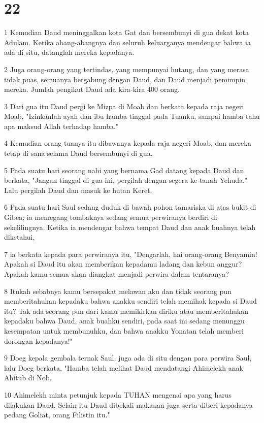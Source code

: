 \chapter{22}

\par 1 Kemudian Daud meninggalkan kota Gat dan bersembunyi di gua dekat kota Adulam. Ketika abang-abangnya dan seluruh keluarganya mendengar bahwa ia ada di situ, datanglah mereka kepadanya.
\par 2 Juga orang-orang yang tertindas, yang mempunyai hutang, dan yang merasa tidak puas, semuanya bergabung dengan Daud, dan Daud menjadi pemimpin mereka. Jumlah pengikut Daud ada kira-kira 400 orang.
\par 3 Dari gua itu Daud pergi ke Mizpa di Moab dan berkata kepada raja negeri Moab, "Izinkanlah ayah dan ibu hamba tinggal pada Tuanku, sampai hamba tahu apa maksud Allah terhadap hamba."
\par 4 Kemudian orang tuanya itu dibawanya kepada raja negeri Moab, dan mereka tetap di sana selama Daud bersembunyi di gua.
\par 5 Pada suatu hari seorang nabi yang bernama Gad datang kepada Daud dan berkata, "Jangan tinggal di gua ini, pergilah dengan segera ke tanah Yehuda." Lalu pergilah Daud dan masuk ke hutan Keret.
\par 6 Pada suatu hari Saul sedang duduk di bawah pohon tamariska di atas bukit di Gibea; ia memegang tombaknya sedang semua perwiranya berdiri di sekelilingnya. Ketika ia mendengar bahwa tempat Daud dan anak buahnya telah diketahui,
\par 7 ia berkata kepada para perwiranya itu, "Dengarlah, hai orang-orang Benyamin! Apakah si Daud itu akan memberikan kepadamu ladang dan kebun anggur? Apakah kamu semua akan diangkat menjadi perwira dalam tentaranya?
\par 8 Itukah sebabnya kamu bersepakat melawan aku dan tidak seorang pun memberitahukan kepadaku bahwa anakku sendiri telah memihak kepada si Daud itu? Tak ada seorang pun dari kamu memikirkan diriku atau memberitahukan kepadaku bahwa Daud, anak buahku sendiri, pada saat ini sedang menunggu kesempatan untuk membunuhku, dan bahwa anakku Yonatan telah memberi dorongan kepadanya!"
\par 9 Doeg kepala gembala ternak Saul, juga ada di situ dengan para perwira Saul, lalu Doeg berkata, "Hamba telah melihat Daud mendatangi Ahimelekh anak Ahitub di Nob.
\par 10 Ahimelekh minta petunjuk kepada TUHAN mengenai apa yang harus dilakukan Daud. Selain itu Daud dibekali makanan juga serta diberi kepadanya pedang Goliat, orang Filistin itu."
